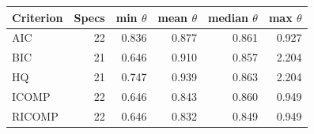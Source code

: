 \begin{tabular}{lrrrrr}
\toprule
Criterion & Specs & min $\theta$ & mean $\theta$ & median $\theta$ & max $\theta$ \\
\midrule
AIC & 22 & 0.836 & 0.877 & 0.861 & 0.927 \\
BIC & 21 & 0.646 & 0.910 & 0.857 & 2.204 \\
HQ & 21 & 0.747 & 0.939 & 0.863 & 2.204 \\
ICOMP & 22 & 0.646 & 0.843 & 0.860 & 0.949 \\
RICOMP & 22 & 0.646 & 0.832 & 0.849 & 0.949 \\
\bottomrule
\end{tabular}
